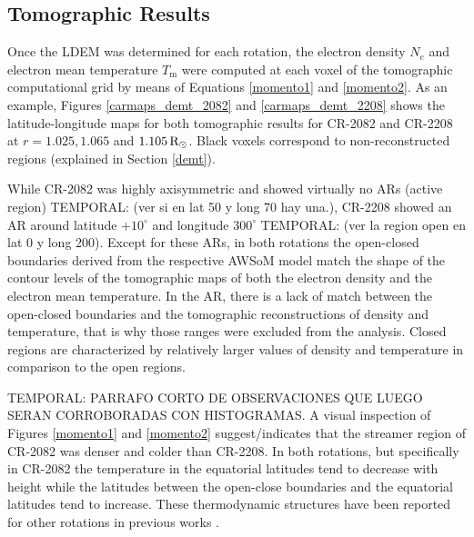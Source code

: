 \documentclass[namedreferences]{solarphysics}
\newcommand{\mdeg}{^\circ}
\newcommand{\mrsun}{{\rm R_\odot}}
\def\temp#1{\textcolor{mygray}{TEMPORAL: #1}}
\begin{document}
\begin{article}
\subsection{Tomographic Results}\label{demt_res} 

Once the LDEM was determined for each rotation, the electron density $N_e$ and electron mean temperature $T_\textrm{m}$ were computed at each voxel of the tomographic computational grid by means of Equations \ref{momento1} and \ref{momento2}. As an example, Figures \ref{carmaps_demt_2082} and \ref{carmaps_demt_2208} shows the latitude-longitude maps for both tomographic results for CR-2082 and CR-2208 at $r=1.025, 1.065$ and $1.105\,\mrsun$. Black voxels correspond to non-reconstructed regions (explained in Section \ref{demt}).


While CR-2082 was highly axisymmetric and showed virtually no ARs (active region) \temp{(ver si en lat 50 y long 70 hay una.)}, CR-2208 showed an AR around latitude $+10\mdeg$ and longitude $300\mdeg$ \temp{(ver la region open en lat 0 y long 200)}. Except for these ARs, in both rotations the open-closed boundaries derived from the respective AWSoM model match the shape of the contour levels of the tomographic maps of both the electron density and the electron mean temperature. In the AR, there is a lack of match between the open-closed boundaries and the tomographic reconstructions of density and temperature, that is why those ranges were excluded from the analysis. Closed regions are characterized by relatively larger values of density and temperature in comparison to the open regions.

\temp{PARRAFO CORTO DE OBSERVACIONES QUE LUEGO SERAN CORROBORADAS CON HISTOGRAMAS.}
A visual inspection of Figures \ref{momento1} and \ref{momento2} suggest/indicates that the streamer region of CR-2082 was denser and colder than CR-2208. In both rotations, but specifically in CR-2082 the temperature in the equatorial latitudes tend to decrease with height while the latitudes between the open-close boundaries and the equatorial latitudes tend to increase. These thermodynamic structures have been reported for other rotations in previous works \citep{lloveras_2017}.



\end{article}
\end{document}
